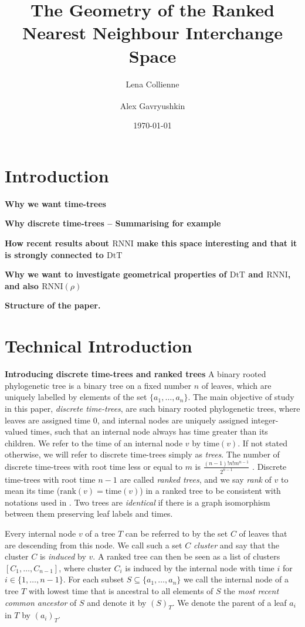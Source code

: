 \documentclass[11pt]{amsart}
\title[Geometry of ranked tree spaces]{The Geometry of the Ranked Nearest Neighbour Interchange Space}
\date{\today}
\author{Lena Collienne}
\author{Alex Gavryushkin\textsuperscript{\Letter}}
\newcommand{\rnni}{\mathrm{RNNI}}
\newcommand{\rank}{\mathrm{rank}}
\newcommand{\ntime}{\mathrm{time}}
\newcommand{\dtt}{\mathrm{DtT}}
\newcommand{\summary}[1]{\textbf{#1}} %
\begin{document}
\begin{abstract}
\end{abstract}

\maketitle


\section{Introduction}

\summary{Why we want time-trees}

\summary{Why discrete time-trees -- Summarising for example}

\summary{How recent results about $\rnni$ make this space interesting and that it is strongly connected to $\dtt$}

\summary{Why we want to investigate geometrical properties of $\dtt$ and $\rnni$, and also $\rnni(\rho)$}

\summary{Structure of the paper.}


\section{Technical Introduction}

\summary{Introducing discrete time-trees and ranked trees}
A binary rooted phylogenetic tree is a binary tree on a fixed number $n$ of leaves, which are uniquely labelled by elements of the set $\{a_1, \ldots, a_n\}$.
The main objective of study in this paper, \emph{discrete time-trees}, are such binary rooted phylogenetic trees, where leaves are assigned time $0$, and internal nodes are uniquely assigned integer-valued times, such that an internal node always has time greater than its children.
We refer to the time of an internal node $v$ by $\ntime(v)$.
If not stated otherwise, we will refer to discrete time-trees simply as \emph{trees}.
The number of discrete time-trees with root time less or equal to $m$ is $\frac{(n-1)!n!m^{n-1}}{2^{n-1}}$ \autocite{Gavryushkin2018-ol}.
Discrete time-trees with root time $n-1$ are called \emph{ranked trees}, and we say \emph{rank} of $v$ to mean its time ($\rank(v) = \ntime(v)$) in a ranked tree to be consistent with notations used in \autocite{Collienne2020-iu}.
Two trees are \emph{identical} if there is a graph isomorphism between them preserving leaf labels and times.

Every internal node $v$ of a tree $T$ can be referred to by the set $C$ of leaves that are descending from this node.
We call such a set $C$ \emph{cluster} and say that the cluster $C$ is \emph{induced} by $v$.
A ranked tree can then be seen as a list of clusters $[C_1, \ldots, C_{n-1}]$, where cluster $C_i$ is induced by the internal node with time $i$ for $i \in \{1, \ldots, n-1\}$.
For each subset $S \subseteq \{a_1, \ldots, a_n\}$ we call the internal node of a tree $T$ with lowest time that is ancestral to all elements of $S$ the \emph{most recent common ancestor} of $S$ and denote it by $(S)_T$.
We denote the parent of a leaf $a_i$ in $T$ by $(a_i)_T$.
\end{document}
